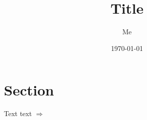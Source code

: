 \documentclass{article}
\title{Title}
\author{Me}
\date{\today}
\begin{document}
\maketitle

\section{Section}
Text \cite{knuth_fa} text $\Rightarrow$

\printbibliography
\end{document}
